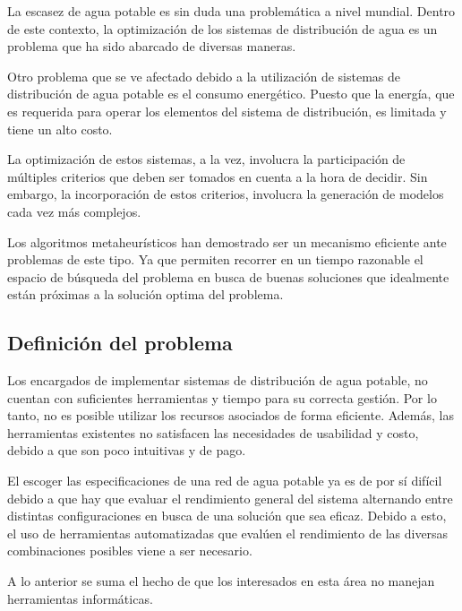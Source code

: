 \documentclass[11pt,letterpaper]{article}
\begin{document}
La escasez de agua potable es sin duda una problemática a nivel mundial. Dentro de este contexto, la optimización de los sistemas de distribución de agua es un problema que ha sido abarcado de diversas maneras.

Otro problema que se ve afectado debido a la utilización de sistemas de distribución de agua potable es el consumo energético. Puesto que la energía, que es requerida para operar los elementos del sistema de distribución, es limitada y tiene un alto costo.

La optimización de estos sistemas, a la vez, involucra la participación de múltiples criterios que deben ser tomados en cuenta a la hora de decidir. Sin embargo, la incorporación de estos criterios, involucra la generación de modelos cada vez más complejos.

Los algoritmos metaheurísticos han demostrado ser un mecanismo eficiente ante problemas de este tipo. Ya que permiten recorrer en un tiempo razonable el espacio de búsqueda del problema en busca de buenas soluciones que idealmente están próximas a la solución optima del problema.

\subsection{Definición del problema} 

Los encargados de implementar sistemas de distribución de agua potable, no cuentan con suficientes herramientas y  tiempo para su correcta gestión. Por lo tanto, no es posible utilizar los recursos asociados de forma eficiente. Además, las herramientas existentes no satisfacen las necesidades de usabilidad y costo, debido a que son poco intuitivas y de pago.

El escoger las especificaciones de una red de agua potable ya es de por sí difícil debido a que hay que evaluar el rendimiento general del sistema alternando entre distintas configuraciones en busca de una solución que sea eficaz. Debido a esto, el uso de herramientas automatizadas que evalúen el rendimiento de las diversas combinaciones posibles viene a ser necesario.

A lo anterior se suma el hecho de que los interesados en esta área no manejan herramientas informáticas.
\end{document}
